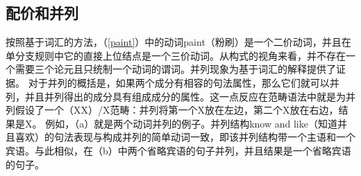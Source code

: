\subsection{配价和并列}
\label{coordination-sec}
    按照基于词汇的方法，（\ref{paint}）中的动词paint（粉刷）是一个二价动词，并且在单分支规则中它的直接上位结点是一个三价动词。从构式的视角来看，并不存在一个需要三个论元且只统制一个动词的谓词。并列现象为基于词汇的解释提供了证据。
    对于并列的概括是，如果两个成分有相容的句法属性，那么它们就可以并列，并且并列得出的成分具有组成成分的属性。这一点反应在范畴语法中就是为并列假设了一个（X\bs X）/X范畴：并列将第一个X放在左边，第二个X放在右边，结果是X。
    例如，（a）就是两个动词并列的例子。并列结构know and like（知道并且喜欢）的句法表现与构成并列的简单动词一致，即该并列结构带一个主语和一个宾语。与此相似，在（b）中两个省略宾语的句子并列，并且结果是一个省略宾语的句子。
\eal
{}
\zl
